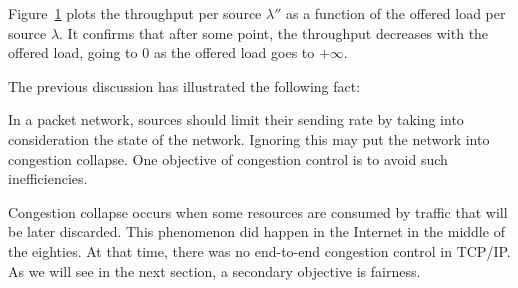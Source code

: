 Figure~\ref{D31-f2n} plots the throughput per source
$\lambda''$ as a function of the offered load per source
$\lambda$. It confirms that after some point, the throughput
decreases with the offered load, going to $0$ as the offered
load goes to $+\infty$.
\begin{figure}[htbp]
        \protect\label{D31-f2n}
\end{figure}

The previous discussion has illustrated the following fact:

\begin{fact}
        In a packet network, sources should limit their sending rate by
        taking into consideration the state of the network.  Ignoring this
        may put the network into congestion collapse. One objective of
        congestion control is to avoid such inefficiencies.
\end{fact}

Congestion collapse occurs when some resources are consumed by
traffic that will be later discarded. This phenomenon did
happen in the Internet in the middle of the eighties. At that
time, there was no end-to-end congestion control in TCP/IP. As
we will see in the next section, a secondary objective is
fairness.

